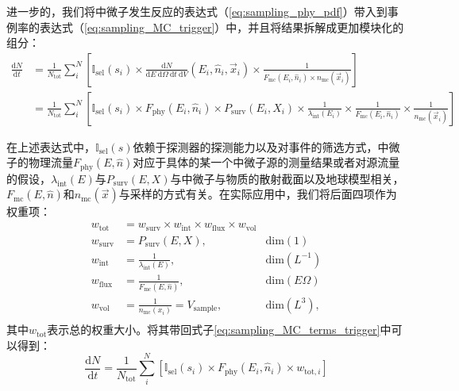 进一步的，我们将中微子发生反应的表达式（\ref{eq:sampling_phy_pdf}）带入到事例率的表达式（\ref{eq:sampling_MC_trigger}）中，并且将结果拆解成更加模块化的组分：
\begin{equation}
\begin{aligned}
    \frac{\mathrm{d}N}{\mathrm{d}t} 
    &= \frac{1}{N_\mathrm{tot}} \sum^N_i \left[ \mathbb{I}_\mathrm{sel}(s_i) \times 
    \frac{\mathrm{d}N}{\mathrm{d}E ~\mathrm{d}\Omega ~\mathrm{d}t ~\mathrm{d}V} (E_i, \hat{n}_i, \vec{x}_i)
    \times \frac{1}{F_\mathrm{mc} (E_i, \hat{n}_i) \times n_\mathrm{mc}(\vec{x}_i)} \right] \\
    &= \frac{1}{N_\mathrm{tot}} \sum^N_i \left[ \mathbb{I}_\mathrm{sel}(s_i) \times 
    F_\mathrm{phy}(E_i, \hat{n}_i) \times
    P_\mathrm{surv}(E_i, X_i) \times
    \frac{1}{\lambda_\mathrm{int}(E_i)} \times
    \frac{1}{F_\mathrm{mc} (E_i, \hat{n}_i)} \times
    \frac{1}{n_\mathrm{mc}(\vec{x}_i)} \right]
\end{aligned}
\label{eq:sampling_MC_terms_trigger}
\end{equation}

在上述表达式中，$\mathbb{I}_\mathrm{sel}(s)$依赖于探测器的探测能力以及对事件的筛选方式，中微子的物理流量$F_\mathrm{phy}(E, \hat{n})$对应于具体的某一个中微子源的测量结果或者对源流量的假设，$\lambda_\mathrm{int}(E)$与$P_\mathrm{surv}(E, X)$与中微子与物质的散射截面以及地球模型相关，$F_\mathrm{mc} (E, \hat{n})$和$n_\mathrm{mc}(\vec{x})$与采样的方式有关。在实际应用中，我们将后面四项作为权重项：
\begin{equation}
\begin{aligned}
    w_\mathrm{tot} &= w_\mathrm{surv} \times w_\mathrm{int} \times w_\mathrm{flux} \times w_\mathrm{vol} \\
    w_\mathrm{surv} &= P_\mathrm{surv}(E, X), &\mathrm{dim}(1) \\
    w_\mathrm{int} &= \frac{1}{\lambda_\mathrm{int}(E)}, &\mathrm{dim}(L^{-1}) \\
    w_\mathrm{flux} &= \frac{1}{F_\mathrm{mc}(E, \hat{n})},  &\mathrm{dim}(E \Omega) \\
    w_\mathrm{vol} &= \frac{1}{n_\mathrm{mc}(x_i)} = V_\mathrm{sample}, &\mathrm{dim}(L^{3}) ,\\
\end{aligned}
\label{eq:weighting_terms}
\end{equation}
其中$w_\mathrm{tot}$表示总的权重大小。将其带回式子\ref{eq:sampling_MC_terms_trigger}中可以得到：
\begin{equation}
    \frac{\mathrm{d}N}{\mathrm{d}t} = 
    \frac{1}{N_\mathrm{tot}} \sum^N_i \left[ 
    \mathbb{I}_\mathrm{sel}(s_i) \times 
    F_\mathrm{phy} (E_i, \hat{n}_i) \times
    w_{\mathrm{tot}, i} \right]
\label{eq:sampling_trigger_rate}
\end{equation}

